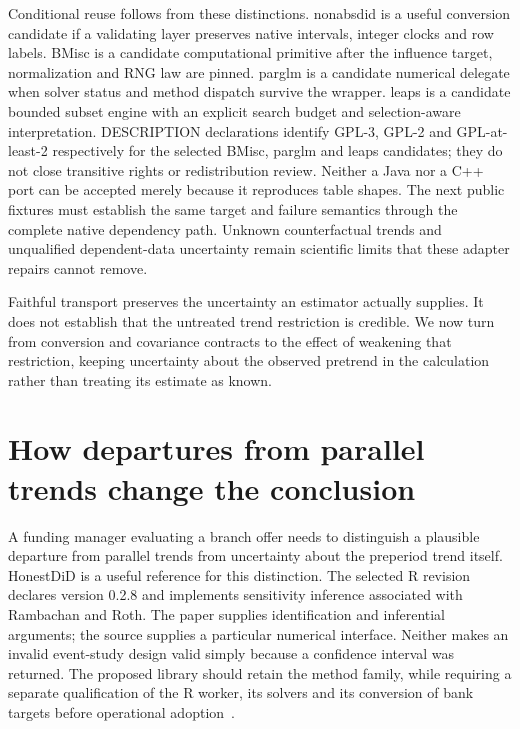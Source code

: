 Conditional reuse follows from these distinctions. nonabsdid is a useful conversion candidate if a validating layer preserves native intervals, integer clocks and row labels. BMisc is a candidate computational primitive after the influence target, normalization and RNG law are pinned. parglm is a candidate numerical delegate when solver status and method dispatch survive the wrapper. leaps is a candidate bounded subset engine with an explicit search budget and selection-aware interpretation. DESCRIPTION declarations identify GPL-3, GPL-2 and GPL-at-least-2 respectively for the selected BMisc, parglm and leaps candidates; they do not close transitive rights or redistribution review. Neither a Java nor a C++ port can be accepted merely because it reproduces table shapes. The next public fixtures must establish the same target and failure semantics through the complete native dependency path. Unknown counterfactual trends and unqualified dependent-data uncertainty remain scientific limits that these adapter repairs cannot remove.~\citep{exec29_panel_inference_sources}


Faithful transport preserves the uncertainty an estimator actually supplies.
It does not establish that the untreated trend restriction is credible. We
now turn from conversion and covariance contracts to the effect of weakening
that restriction, keeping uncertainty about the observed pretrend in the
calculation rather than treating its estimate as known.

\section{How departures from parallel trends change the conclusion}
\label{exec22:hd-scope}

A funding manager evaluating a branch offer needs to distinguish a plausible
departure from parallel trends from uncertainty about the preperiod trend itself.
HonestDiD is a useful reference for this distinction. The selected R revision
declares version 0.2.8 and implements sensitivity inference associated with
Rambachan and Roth. The paper supplies identification and inferential arguments;
the source supplies a particular numerical interface. Neither makes an invalid
event-study design valid simply because a confidence interval was returned.
The proposed library should retain the method family, while requiring a separate
qualification of the R worker, its solvers and its conversion of bank targets
before operational adoption~\citep{rambachan2023,exec22_honestdid_engine}.

